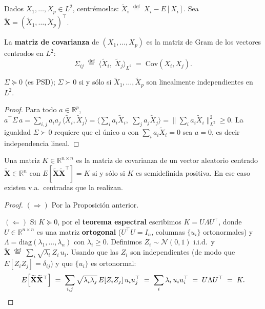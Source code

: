Dados $X_1,\dots,X_p \in L^2$, centrémoslas: $\widetilde X_i \;\stackrel{\text{def}}{=}\;
X_i - E[X_i]$. Sea $\widetilde{\mathbf{X}} = (\widetilde X_1,\dots,\widetilde X_p)^\top$.

\begin{definition}[Matriz de covarianza = matriz de Gram]
	\label{def:cov-gram}
	La \textbf{matriz de covarianza} de $(X_1,\dots,X_p)$ es la matriz de Gram de
	los vectores centrados en $L^2$:
	\[
	\Sigma_{ij} \;\stackrel{\text{def}}{=}\; \langle \widetilde X_i,\;
	\widetilde X_j\rangle_{L^2} \;=\; \mathrm{Cov}(X_i, X_j).
	\]
\end{definition}

\begin{proposition}
	$\Sigma \succeq 0$ (es PSD); $\Sigma \succ 0$ si y sólo si
	$\widetilde X_1,\dots,\widetilde X_p$ son linealmente independientes en $L^2$.
\end{proposition}

\begin{proof}
	Para todo $a \in \mathbb{R}^p$,
	$a^\top \Sigma\, a = \sum_{i,j} a_i a_j\, \langle \widetilde X_i,
	\widetilde X_j\rangle = \bigl\langle \sum_i a_i \widetilde X_i,\;
	\sum_j a_j \widetilde X_j \bigr\rangle = \bigl\| \sum_i a_i
	\widetilde X_i \bigr\|_{L^2}^2 \ge 0$.
	La igualdad $\Sigma \succ 0$ requiere que el único $a$ con
	$\sum_i a_i \widetilde X_i = 0$ sea $a=0$, es decir independencia lineal.
\end{proof}

\begin{theorem}
	\label{thm:psd-is-gram}
	Una matriz $K \in \mathbb{R}^{n \times n}$ es la matriz de covarianza de un
	vector aleatorio centrado $\widetilde{\mathbf{X}} \in \mathbb{R}^n$ con
	$E[\widetilde{\mathbf{X}} \widetilde{\mathbf{X}}^\top] = K$ si y sólo si
	$K$ es semidefinida positiva.  En ese caso existen v.a.\ centradas que la
	realizan.
\end{theorem}

\begin{proof}
	$(\Rightarrow)$ Por la Proposición anterior.

	$(\Leftarrow)$ Si $K \succeq 0$, por el \textbf{teorema espectral} escribimos
	$K = U \Lambda U^\top$, donde $U \in \mathbb{R}^{n \times n}$ es una matriz
	\textbf{ortogonal} ($U^\top U = I_n$, columnas $\{u_i\}$ ortonormales) y
	$\Lambda = \mathrm{diag}(\lambda_1, \dots, \lambda_n)$ con $\lambda_i \ge 0$.
	Definimos $Z_i \sim \mathcal{N}(0,1)$ i.i.d.\ y
	$\widetilde{\mathbf{X}} \;\stackrel{\text{def}}{=}\; \sum_i \sqrt{\lambda_i}\,
	Z_i\, u_i$.  Usando que las $Z_i$ son independientes (de modo que
	$E[Z_i Z_j] = \delta_{ij}$) y que $\{u_i\}$ es ortonormal:
	\[
	E\!\left[\widetilde{\mathbf{X}}\widetilde{\mathbf{X}}^\top\right]
	\;=\; \sum_{i,j} \sqrt{\lambda_i \lambda_j}\,
	E[Z_i Z_j]\, u_i u_j^\top
	\;=\; \sum_i \lambda_i\, u_i u_i^\top
	\;=\; U \Lambda U^\top \;=\; K. \qedhere
	\]
\end{proof}

